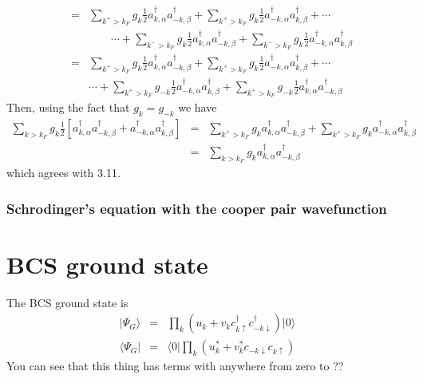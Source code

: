 \documentclass{article}
\begin{document}
\begin{flushleft}
\begin{eqnarray*}
 & = & \sum_{k^{+}>k_{F}}g_{k}\frac{1}{2}a_{k,\alpha}^{\dagger}a_{-k,\beta}^{\dagger}+\sum_{k^{+}>k_{F}}g_{k}\frac{1}{2}a_{-k,\alpha}^{\dagger}a_{k,\beta}^{\dagger}+\cdots\\
 &  & \qquad\cdots+\sum_{k^{-}>k_{F}}g_{k}\frac{1}{2}a_{k,\alpha}^{\dagger}a_{-k,\beta}^{\dagger}+\sum_{k^{-}>k_{F}}g_{k}\frac{1}{2}a_{-k,\alpha}^{\dagger}a_{k,\beta}^{\dagger}\\
 & = & \sum_{k^{+}>k_{F}}g_{k}\frac{1}{2}a_{k,\alpha}^{\dagger}a_{-k,\beta}^{\dagger}+\sum_{k^{+}>k_{F}}g_{k}\frac{1}{2}a_{-k,\alpha}^{\dagger}a_{k,\beta}^{\dagger}+\cdots\\
 &  & \cdots+\sum_{k^{+}>k_{F}}g_{-k}\frac{1}{2}a_{-k,\alpha}^{\dagger}a_{k,\beta}^{\dagger}+\sum_{k^{+}>k_{F}}g_{-k}\frac{1}{2}a_{k,\alpha}^{\dagger}a_{-k,\beta}^{\dagger}\end{eqnarray*}
Then, using the fact that $g_{k}=g_{-k}$ we have\begin{eqnarray*}
\sum_{k>k_{F}}g_{k}\frac{1}{2}\left[a_{k,\alpha}^{\dagger}a_{-k,\beta}^{\dagger}+a_{-k,\alpha}^{\dagger}a_{k,\beta}^{\dagger}\right] & = & \sum_{k^{+}>k_{F}}g_{k}a_{k,\alpha}^{\dagger}a_{-k,\beta}^{\dagger}+\sum_{k^{+}>k_{F}}g_{k}a_{-k,\alpha}^{\dagger}a_{k,\beta}^{\dagger}\\
 & = & \sum_{k>k_{F}}g_{k}a_{k,\alpha}^{\dagger}a_{-k,\beta}^{\dagger}\end{eqnarray*}
which agrees with 3.11.
\par\end{flushleft}


\subsubsection*{Schrodinger's equation with the cooper pair wavefunction}


\section*{BCS ground state}

The BCS ground state is\begin{eqnarray*}
|\Psi_{G}\rangle & = & \prod_{k}(u_{k}+v_{k}c_{k\uparrow}^{\dagger}c_{-k\downarrow}^{\dagger})|0\rangle\\
\langle\Psi_{G}| & = & \langle0|\prod_{k}(u_{k}^{*}+v_{k}^{*}c_{-k\downarrow}c_{k\uparrow})\end{eqnarray*}
You can see that this thing has terms with anywhere from zero to ??
\end{document}
